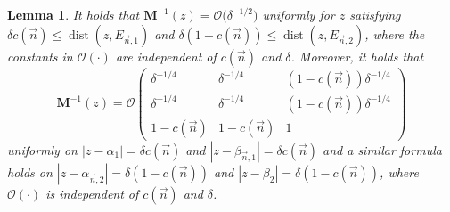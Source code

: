 \documentclass[10pt,a4paper]{amsart}
\numberwithin{equation}{section}
\newtheorem{Lemma}[Theorem]{Lemma}
\newcommand{\dist}{\operatorname{dist}}
\newcommand{\n}{{\vec n}}
\begin{document}
\begin{Lemma}
\label{lem:Mbounds2}
It holds that $ \boldsymbol M^{-1}(z) = \boldsymbol{\mathcal O}\bigl(\delta^{-1/2}\bigr) $ uniformly for $ z $ satisfying $ \delta c(\n) \leq \dist(z,E_{\n,1} ) $ and $ \delta(1-c(\n)) \leq \dist(z,E_{\n,2}) $, where the constants in $ \boldsymbol{\mathcal O}(\cdot) $ are independent of $ c(\n) $ and $ \delta $. Moreover, it holds that
\[
\boldsymbol M^{-1}(z) = \boldsymbol{\mathcal O} \begin{pmatrix} \delta^{-1/4} & \delta^{-1/4} & (1-c(\n))\delta^{-1/4} \\ \delta^{-1/4} & \delta^{-1/4} & (1-c(\n))\delta^{-1/4} \\ 1-c(\n) & 1-c(\n) & 1 \end{pmatrix}
\]
uniformly on $ |z-\alpha_1| = \delta c(\n) $ and $ |z-\beta_{\n,1}| = \delta c(\n) $ and a similar formula holds on $ |z-\alpha_{\n,2}| = \delta (1-c(\n)) $ and $ |z-\beta_2| = \delta (1-c(\n)) $, where $\boldsymbol{\mathcal O}(\cdot) $ is independent of $ c(\n) $ and $ \delta $.
\end{Lemma}
\end{document}

